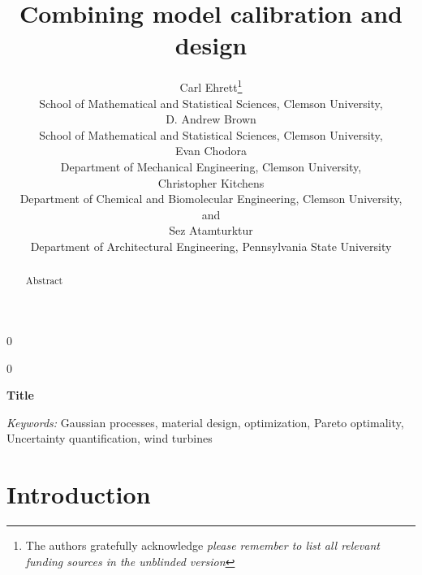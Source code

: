 \documentclass[12pt]{article}
\newcommand{\blind}{0}
\begin{document}
%

\def\spacingset#1{\renewcommand{\baselinestretch}%
{#1}\small\normalsize} \spacingset{1}



\blind
{
  \title{\bf Combining model calibration and design}
  \author{Carl Ehrett\thanks{
    The authors gratefully acknowledge \textit{please remember to list all relevant funding sources in the unblinded version}}\hspace{.2cm}\\
    School of Mathematical and Statistical Sciences, Clemson University,\\
    D. Andrew Brown \\
    School of Mathematical and Statistical Sciences, Clemson University,\\
    Evan Chodora \\
    Department of Mechanical Engineering, Clemson University,\\
    Christopher Kitchens \\
    Department of Chemical and Biomolecular Engineering, Clemson University,\\
    and \\
    Sez Atamturktur \\
    Department of Architectural Engineering, Pennsylvania State University\\}
  \maketitle
} \fi

\blind
{
  \bigskip
  \bigskip
  \bigskip
  \begin{center}
    {\LARGE\bf Title}
\end{center}
  \medskip
} \fi

\bigskip
\begin{abstract}
Abstract
\end{abstract}

\noindent%
{\it Keywords:}  Gaussian processes, material design, optimization, Pareto optimality, Uncertainty quantification, wind turbines
\vfill

\newpage
\spacingset{2} %
\section{Introduction}
\label{introduction}
\end{document}
